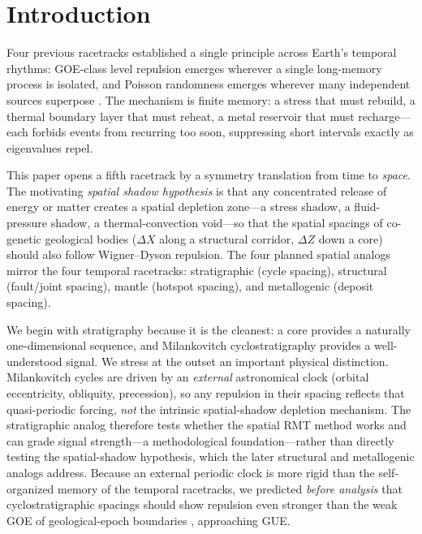 \documentclass[12pt,a4paper]{article}
\begin{document}
\section{Introduction}

Four previous racetracks established a single principle across Earth's temporal rhythms: GOE-class level repulsion emerges wherever a single long-memory process is isolated, and Poisson randomness emerges wherever many independent sources superpose \citep{chen2026geo,chen2026fault,chen2026plume,chen2026metal}. The mechanism is finite memory: a stress that must rebuild, a thermal boundary layer that must reheat, a metal reservoir that must recharge---each forbids events from recurring too soon, suppressing short intervals exactly as eigenvalues repel.

This paper opens a fifth racetrack by a symmetry translation from time to \emph{space}. The motivating \emph{spatial shadow hypothesis} is that any concentrated release of energy or matter creates a spatial depletion zone---a stress shadow, a fluid-pressure shadow, a thermal-convection void---so that the spatial spacings of co-genetic geological bodies ($\Delta X$ along a structural corridor, $\Delta Z$ down a core) should also follow Wigner--Dyson repulsion. The four planned spatial analogs mirror the four temporal racetracks: stratigraphic (cycle spacing), structural (fault/joint spacing), mantle (hotspot spacing), and metallogenic (deposit spacing).

We begin with stratigraphy because it is the cleanest: a core provides a naturally one-dimensional sequence, and Milankovitch cyclostratigraphy provides a well-understood signal. We stress at the outset an important physical distinction. Milankovitch cycles are driven by an \emph{external} astronomical clock (orbital eccentricity, obliquity, precession), so any repulsion in their spacing reflects that quasi-periodic forcing, \emph{not} the intrinsic spatial-shadow depletion mechanism. The stratigraphic analog therefore tests whether the spatial RMT method works and can grade signal strength---a methodological foundation---rather than directly testing the spatial-shadow hypothesis, which the later structural and metallogenic analogs address. Because an external periodic clock is more rigid than the self-organized memory of the temporal racetracks, we predicted \emph{before analysis} that cyclostratigraphic spacings should show repulsion even stronger than the weak GOE of geological-epoch boundaries \citep{chen2026geo}, approaching GUE.
\end{document}
